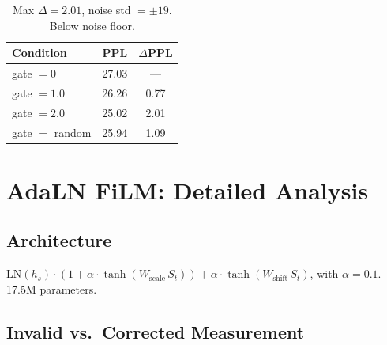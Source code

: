 \documentclass[11pt,a4paper]{article}
\newcommand{\St}{S_t}
\begin{document}
\begin{table}[h]

\centering

\begin{tabular}{lcc}

\toprule

\textbf{Condition} & \textbf{PPL} & $\Delta$\textbf{PPL} \\

\midrule

gate $= 0$      & 27.03 & ---  \\

gate $= 1.0$    & 26.26 & 0.77 \\

gate $= 2.0$    & 25.02 & 2.01 \\

gate $=$ random & 25.94 & 1.09 \\

\bottomrule

\end{tabular}

\caption{Max $\Delta = 2.01$, noise std $= \pm 19$. Below noise floor.}

\end{table}



\section{AdaLN FiLM: Detailed Analysis}

\label{app:adaln}



\subsection*{Architecture}



$\mathrm{LN}(h_s) \cdot (1 + \alpha\cdot\tanh(W_\mathrm{scale}\,\St)) +

\alpha\cdot\tanh(W_\mathrm{shift}\,\St)$, with $\alpha = 0.1$. 17.5M parameters.



\subsection*{Invalid vs.\ Corrected Measurement}
\end{document}
